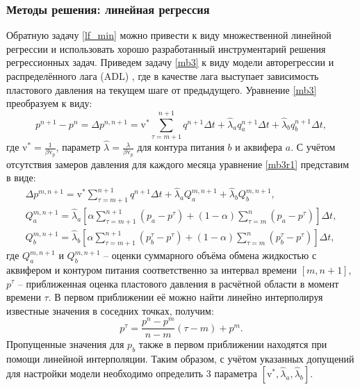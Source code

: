\documentclass[14pt]{article}
\begin{document}
\subsubsection{Методы решения: линейная регрессия} 
Обратную задачу \ref{lf_min} можно привести к виду множественной линейной регрессии и использовать хорошо разработанный инструментарий решения регрессионных задач. Приведем задачу \ref{mb3} к виду модели  авторегрессии и распределённого лага (ADL) \cite{econome3k}, где в качестве лага выступает зависимость пластового давления на текущем шаге от предыдущего.  
Уравнение \ref{mb3} преобразуем к виду:
\begin{equation}\label{mb3r1}
	p^{n+1} - p^n = \Delta p^{n,n+1} = \mathrm{v}^*\sum_{\tau=m+1}^{n+1}q^{n+1}\Delta t + \hat{\lambda}_a q_a^{n+1}\Delta t +	\hat{\lambda}_b q_b^{n+1}\Delta t,
\end{equation}
где $\mathrm{v}^* = \frac{1}{\beta \mathrm{v}_p}$, параметр $\hat{\lambda} = \frac{\lambda}{\beta \mathrm{v}_p}$ для контура питания $b$ и аквифера $a$. С учётом отсутствия замеров давления для каждого месяца уравнение \ref{mb3r1} представим в виде:
\begin{equation}\label{mb3r2}
	\begin{aligned}
		\Delta p^{m,n+1} = \mathrm{v}^* \sum_{\tau=m+1}^{n+1}q^{n+1}\Delta t + \hat{\lambda}_a Q^{m,n+1}_a + \hat{\lambda}_b Q^{m,n+1}_b,
		\\
		Q^{m,n+1}_a =  \hat{\lambda}_a\left[\alpha\sum_{\tau=m+1}^{n+1} \left(p_a - p^{\tau}\right) + \left(1-\alpha\right)\sum_{\tau=m}^{n} \left(p_a - p^{\tau}\right)\right]\Delta t,
		\\
		Q^{m,n+1}_b =  \hat{\lambda}_b\left[\alpha\sum_{\tau=m+1}^{n+1} \left(p_b^{\tau} - p^{\tau}\right) + \left(1-\alpha\right)\sum_{\tau=m}^{n} \left(p_b^{\tau} - p^{\tau}\right)\right]\Delta t,
	\end{aligned}
\end{equation}
где $Q^{m,n+1}_a$ и $Q^{m,n+1}_b$ -- оценки суммарного объёма обмена жидкостью с аквифером и контуром питания соответственно за интервал времени  $[m,n+1]$, $p^{\tau}$ -- приближенная оценка пластового давления в расчётной области в момент времени $\tau$. В первом приближении её можно найти линейно интерполируя известные значения в соседних точках, получим:
\begin{equation*}
	p^{\tau} = \frac{p^n - p^m}{n-m}\left(\tau-m\right) + p^m.
\end{equation*}
Пропущенные значения для $p_b$ также в первом приближении находятся при помощи линейной интерполяции. 
 Таким образом, с учётом указанных допущений для настройки модели необходимо определить 3 параметра $[\mathrm{v}^*, \hat{\lambda}_a, \hat{\lambda}_b]$. 
 
\end{document}
